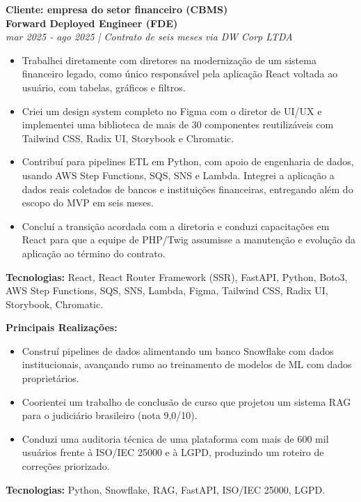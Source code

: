 \documentclass[10pt,a4paper]{altacv}
\begin{document}
\textbf{Cliente: empresa do setor financeiro (CBMS)}\\
\textbf{Forward Deployed Engineer (FDE)}\\
\textit{mar 2025 - ago 2025 | Contrato de seis meses via DW Corp LTDA}
\begin{itemize}
\setlength{\itemindent}{0.5em}
\item[--] Trabalhei diretamente com diretores na modernização de um sistema financeiro legado, como único responsável pela aplicação React voltada ao usuário, com tabelas, gráficos e filtros.
\item[--] Criei um design system completo no Figma com o diretor de UI/UX e implementei uma biblioteca de mais de 30 componentes reutilizáveis com Tailwind CSS, Radix UI, Storybook e Chromatic.
\item[--] Contribuí para pipelines ETL em Python, com apoio de engenharia de dados, usando AWS Step Functions, SQS, SNS e Lambda. Integrei a aplicação a dados reais coletados de bancos e instituições financeiras, entregando além do escopo do MVP em seis meses.
\item[--] Concluí a transição acordada com a diretoria e conduzi capacitações em React para que a equipe de PHP/Twig assumisse a manutenção e evolução da aplicação ao término do contrato.
\end{itemize}
\textbf{Tecnologias:} React, React Router Framework (SSR), FastAPI, Python, Boto3, AWS Step Functions, SQS, SNS, Lambda, Figma, Tailwind CSS, Radix UI, Storybook, Chromatic.
\vspace{4mm}


\textbf{Principais Realizações:}
\begin{itemize}
\setlength{\itemindent}{0.5em}
\item[--] Construí pipelines de dados alimentando um banco Snowflake com dados institucionais, avançando rumo ao treinamento de modelos de ML com dados proprietários.
\item[--] Coorientei um trabalho de conclusão de curso que projetou um sistema RAG para o judiciário brasileiro (nota 9,0/10).
\item[--] Conduzi uma auditoria técnica de uma plataforma com mais de 600 mil usuários frente à ISO/IEC 25000 e à LGPD, produzindo um roteiro de correções priorizado.
\end{itemize}
\textbf{Tecnologias:} Python, Snowflake, RAG, FastAPI, ISO/IEC 25000, LGPD.
\vspace{4mm}
\end{document}

